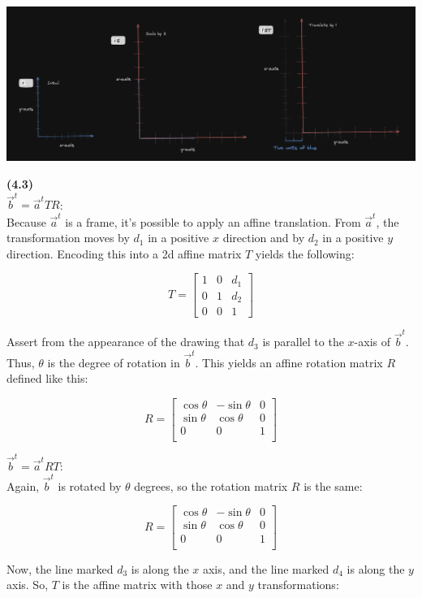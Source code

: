 \documentclass[letterpaper, 11pt]{article}
\begin{document}
\medskip
\noindent \includegraphics[scale=0.3]{./pics/q2.png}

\newpage
\noindent \textbf{(4.3)} \\
$\vec{b}^t = \vec{a}^t TR$: \\
Because $\vec{a}^t$ is a frame, it's possible to apply an affine translation. From $\vec{a}^t$, the transformation moves by $d_1$ in a positive $x$ direction and by $d_2$ in a positive $y$ direction. Encoding this into a 2d affine matrix $T$ yields the following:

$$T = \begin{bmatrix}
  1 & 0 & d_1 \\
  0 & 1 & d_2 \\ 
  0 & 0 & 1
\end{bmatrix}$$

Assert from the appearance of the drawing that $d_3$ is parallel to the $x$-axis of $\vec{b}^t$. Thus, $\theta$ is the degree of rotation in $\vec{b}^t$. This yields an affine rotation matrix $R$ defined like this:

$$R = \begin{bmatrix}
  \cos \theta & - \sin \theta & 0 \\ 
  \sin \theta & \cos \theta & 0 \\ 
  0 & 0 & 1 \\
\end{bmatrix}$$

\medskip
\noindent $\vec{b}^t = \vec{a}^t RT$: \\
Again, $\vec{b}^t$ is rotated by $\theta$ degrees, so the rotation matrix $R$ is the same:

$$R = \begin{bmatrix}
  \cos \theta & - \sin \theta & 0 \\ 
  \sin \theta & \cos \theta & 0 \\ 
  0 & 0 & 1 \\
\end{bmatrix}$$

Now, the line marked $d_3$ is along the $x$ axis, and the line marked $d_4$ is along the $y$ axis. So, $T$ is the affine matrix with those $x$ and $y$ transformations:
\end{document}
